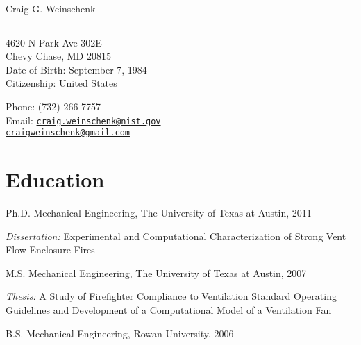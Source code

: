 \documentclass[10pt,letterpaper]{article}
\def\name{Craig G. Weinschenk}
\renewenvironment{itemize}{
  \begin{list}{}{
    \setlength{\leftmargin}{1.5em}
  }
}{
  \end{list}
}
\begin{document}
{\huge \name} \\
\noindent\rule{17cm}{0.4pt}


\vspace{0.25in}

\begin{minipage}[t]{0.5\textwidth}
  4620 N Park Ave 302E \\
  Chevy Chase, MD  20815\\
  Date of Birth: September 7, 1984 \\
  Citizenship: United States
\end{minipage}
\begin{minipage}[t]{0.5\textwidth}
  Phone: (732) 266-7757 \\
  Email: \href{mailto:craig.weinschenk@nist.gov} {\tt craig.weinschenk@nist.gov}\\
         \href{mailto:craigweinschenk@gmail.com} {\tt craigweinschenk@gmail.com}\\

\end{minipage}

\section*{Education}

\begin{itemize}
  \item Ph.D. Mechanical Engineering, The University of Texas at Austin, 2011
    \begin{itemize}
      \item \textit{Dissertation:} Experimental and Computational Characterization of Strong Vent Flow Enclosure Fires
    \end{itemize}

  \item M.S. Mechanical Engineering, The University of Texas at Austin, 2007
    \begin{itemize}
      \item \textit{Thesis:} A Study of Firefighter Compliance to Ventilation Standard Operating Guidelines and Development of a Computational Model of a Ventilation Fan
    \end{itemize}

  \item B.S. Mechanical Engineering, Rowan University, 2006
\end{itemize}
\end{document}
